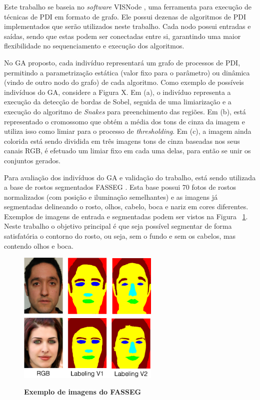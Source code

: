 \documentclass[12pt,oneside,a4paper,english,french,spanish,brazil,]{abntex2}
\begin{document}
Este trabalho se baseia no \textit{software} VISNode \cite{visnode}, uma ferramenta para execução de técnicas de PDI em formato de grafo. Ele possui dezenas de algoritmos de PDI implementados que serão utilizados neste trabalho. Cada nodo possui entradas e saídas, sendo que estas podem ser conectadas entre si, garantindo uma maior flexibilidade no sequenciamento e execução dos algoritmos.

No GA proposto, cada indivíduo representará um grafo de processos de PDI, permitindo a parametrização estática (valor fixo para o parâmetro) ou dinâmica (vindo de outro nodo do grafo) de cada algoritmo. Como exemplo de possíveis indivíduos do GA, considere a Figura X. Em (a), o indivíduo representa a execução da detecção de bordas de Sobel, seguida de uma limiarização e a execução do algoritmo de \textit{Snakes} para preenchimento das regiões. Em (b), está representado o cromossomo que obtém a média dos tons de cinza da imagem e utiliza isso como limiar para o processo de \textit{thresholding}. Em (c), a imagem ainda colorida está sendo dividida em três imagens tons de cinza baseadas nos seus canais RGB, é efetuado um limiar fixo em cada uma delas, para então se unir os conjuntos gerados.

Para avaliação dos indivíduos do GA e validação do trabalho, está sendo utilizada a base de rostos segmentados FASSEG \cite{fasseg}. Esta base possui 70 fotos de rostos normalizados (com posição e iluminação semelhantes) e as imagens já segmentadas delineando o rosto, olhos, cabelo, boca e nariz em cores diferentes. Exemplos de imagens de entrada e segmentadas podem ser vistos na Figura ~\ref{fig:FASSEG}. Neste trabalho o objetivo principal é que seja possível segmentar de forma satisfatória o contorno do rosto, ou seja, sem o fundo e sem os cabelos, mas contendo olhos e boca.

\begin{figure}[ht]
\centering
\caption{\textbf{Exemplo de imagens do FASSEG}}
\includegraphics[width=0.6\textwidth]{imagens/FASSEG.png}
\label{fig:FASSEG}
\end{figure}
\end{document}
